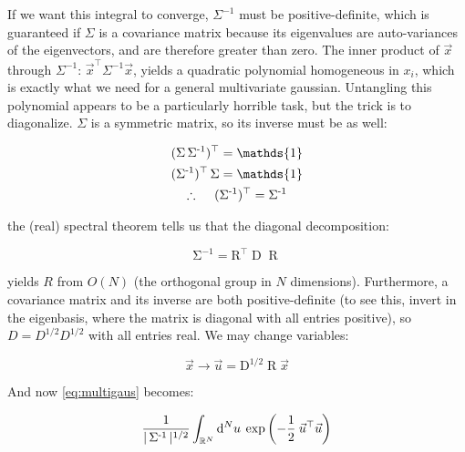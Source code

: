 \documentclass[10pt,letterpaper]{article}
\def\d{{\rm d}}  %
\begin{document}
If we want this integral to converge, $\Sigma^{-1}$ must be positive-definite, which is guaranteed if $\Sigma$ is a covariance matrix because its eigenvalues are auto-variances of the eigenvectors, and are therefore greater than zero. The inner product of $\vec{x}$ through $\Sigma^{-1}$: $\vec{x}^\top \Sigma^{-1} \vec{x}$, yields a quadratic polynomial homogeneous in $x_i$, which is exactly what we need for a general multivariate gaussian. Untangling this polynomial appears to be a particularly horrible task, but the trick is to diagonalize.
$\Sigma$ is a symmetric matrix, so its inverse must be as well:

\begin{gather*}
(\operatorname{\Sigma} \operatorname{\Sigma^{-1}})^\top = \mathds{1} \\
(\operatorname{\Sigma^{-1}})^\top \operatorname{\Sigma} = \mathds{1} \\
\therefore \hspace{1pc}  (\operatorname{\Sigma^{-1}})^\top = \operatorname{\Sigma^{-1}}
\end{gather*}

the (real) spectral theorem tells us that the diagonal decomposition:

\begin{equation} \label{eq:diagdecomp}
\operatorname{\Sigma^{-1}} = \operatorname{R^\top} \operatorname{D} \operatorname{R}
\end{equation} 

yields $R$ from $O(N)$ (the orthogonal group in $N$ dimensions).
Furthermore, a covariance matrix and its inverse are both positive-definite (to see this, invert in the eigenbasis, where the matrix is diagonal with all entries positive), so $D= D^{1/2} D^{1/2}$ with all entries real.
We may change variables:

\begin{equation} \label{eq:changevar}
\vec{x} \rightarrow \vec{u} = \operatorname{D^{1/2}} \operatorname{R} \vec{x}
\end{equation}

And now \ref{eq:multigaus} becomes:

\begin{equation} \label{eq:multigaus_trans}
\dfrac{1}{|\operatorname{\Sigma^{-1}}|^{1/2}} \int_{\mathbb{R}^N} \d^N u \hspace{0.2pc} \exp \left(-\dfrac{1}{2} \hspace{0.2pc} \vec{u}^\top \vec{u}\right)
\end{equation}
\end{document}
